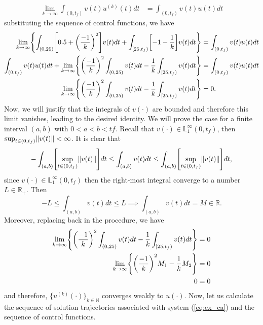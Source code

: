 \documentclass[11pt,letterpaper]{article}
\newcommand{\NN}{{\mathbb{N}}}
\newcommand{\LL}{{\mathbb{L}}}
\newcommand{\RR}{{\mathbb{R}}}
\let\originalleft\left
\let\originalright\right
\renewcommand{\left}{\mathopen{}\mathclose\bgroup\originalleft}
\renewcommand{\right}{\aftergroup\egroup\originalright}
\newcommand{\norm}[1]{\left\lVert#1\right\rVert}
\theoremstyle{definition}
\begin{document}
\begin{enumerate}[label=\alph*)]
\[\begin{split}
    \lim_{k\rightarrow\infty}\int_{(0,t_f)}v(t)u^{(k)}(t)dt&=\int_{(0,t_f)}v(t)u(t)dt
    \end{split}
    \]
    substituting the sequence of control functions, we have
    \[
    \begin{split}
    \lim_{k\rightarrow\infty}\left\{\int_{(0,25)}\left[0.5+\left(\dfrac{-1}{k}\right)^2\right]v(t)dt+\int_{[25,t_f)}\left[-1-\dfrac{1}{k}\right]v(t)dt\right\}&=\int_{(0,t_f)}v(t)u(t)dt\\
    \int_{(0,t_f)}v(t)u(t)dt + \lim_{k\rightarrow\infty}\left\{\left(\dfrac{-1}{k}\right)^2\int_{(0,25)}v(t)dt-\dfrac{1}{k}\int_{[25,t_f)}v(t)dt\right\}&=\int_{(0,t_f)}v(t)u(t)dt\\
    \lim_{k\rightarrow\infty}\left\{\left(\dfrac{-1}{k}\right)^2\int_{(0,25)}v(t)dt-\dfrac{1}{k}\int_{[25,t_f)}v(t)dt\right\}&=0.
    \end{split}
    \]
    Now, we will justify that the integrals of $v(\cdot)$ are bounded and therefore this limit vanishes, leading to the desired identity. We will prove the case for a finite interval $(a,b)$ with $0<a<b<tf$. Recall that $v(\cdot)\in\LL_1^\infty(0,t_f)$, then $\sup_{t\in(0,t_f)}\norm{v(t)}<\infty$. It is clear that 
    \[
    -\int_{(a,b)}\left[\sup_{t\in(0,t_f)}\norm{v(t)}\right]dt\leq\int_{(a,b)}v(t)dt\leq\int_{(a,b)}\left[\sup_{t\in(0,t_f)}\norm{v(t)}\right]dt,
    \]
    since $v(\cdot)\in\LL^\infty_1(0,t_f)$ then the right-most integral converge to a number $L\in\RR_+$. Then
    \[
    -L\leq\int_{(a,b)}v(t)dt\leq L\implies    \int_{(a,b)}v(t)dt=M\in\RR.
    \]
    Moreover, replacing back in the procedure, we have 
    \[
    \begin{split}
        \lim_{k\rightarrow\infty}\left\{\left(\dfrac{-1}{k}\right)^2\int_{(0,25)}v(t)dt-\dfrac{1}{k}\int_{[25,t_f)}v(t)dt\right\}&=0\\
        \lim_{k\rightarrow\infty}\left\{\left(\dfrac{-1}{k}\right)^2M_1-\dfrac{1}{k}M_2\right\}&=0\\
        0&=0
    \end{split}
    \]
    and therefore, $\{u^{(k)}(\cdot)\}_{k\in\NN}$ converges weakly to $u(\cdot)$. Now, let us calculate the sequence of solution trajectories associated with system (\ref{eq:ex_ca}) and the sequence of control functions.
    

\end{enumerate}
\end{document}
